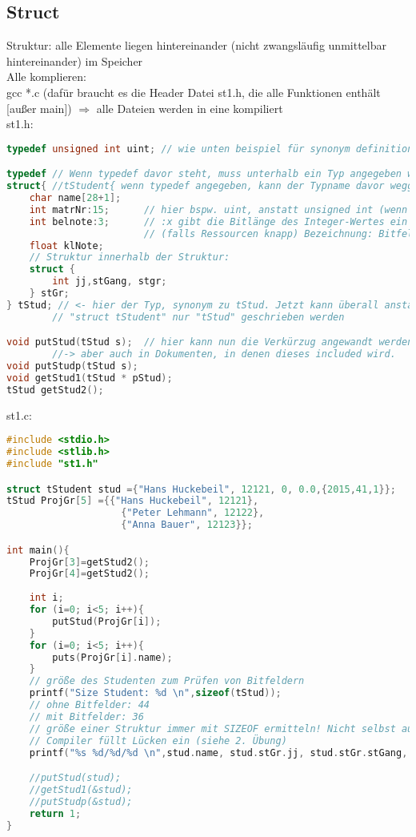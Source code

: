\subsection{Struct}
Struktur: alle Elemente liegen hintereinander (nicht zwangsläufig unmittelbar hintereinander) im Speicher \medskip\\
Alle komplieren:\\
gcc *.c (dafür braucht es die Header Datei st1.h, die alle Funktionen enthält [außer main]) $\Rightarrow$ alle Dateien werden in eine kompiliert\\
st1.h:
\begin{lstlisting}[language=C]
typedef unsigned int uint; // wie unten beispiel für synonym definition

typedef	// Wenn typedef davor steht, muss unterhalb ein Typ angegeben werden
struct{ //tStudent{ wenn typedef angegeben, kann der Typname davor weggelassen werden.
	char name[28+1];
	int matrNr:15;		// hier bspw. uint, anstatt unsigned int (wenn benötigt)
	int belnote:3;		// :x gibt die Bitlänge des Integer-Wertes ein 
						// (falls Ressourcen knapp) Bezeichnung: Bitfelder
	float klNote;
	// Struktur innerhalb der Struktur:
	struct {
		int jj,stGang, stgr;
	} stGr;
} tStud; // <- hier der Typ, synonym zu tStud. Jetzt kann überall anstatt 
		// "struct tStudent" nur "tStud" geschrieben werden

void putStud(tStud s);	// hier kann nun die Verkürzug angewandt werden 
		//-> aber auch in Dokumenten, in denen dieses included wird.
void putStudp(tStud s);
void getStud1(tStud * pStud);
tStud getStud2();
\end{lstlisting}
st1.c:
\begin{lstlisting}[language=C]
#include <stdio.h>
#include <stlib.h>
#include "st1.h"

struct tStudent stud ={"Hans Huckebeil", 12121, 0, 0.0,{2015,41,1}};
tStud ProjGr[5] ={{"Hans Huckebeil", 12121},
					{"Peter Lehmann", 12122},
					{"Anna Bauer", 12123}};

int main(){
	ProjGr[3]=getStud2();
	ProjGr[4]=getStud2();
	
	int i;
	for (i=0; i<5; i++){
		putStud(ProjGr[i]);
	}
	for (i=0; i<5; i++){
		puts(ProjGr[i].name);
	}
	// größe des Studenten zum Prüfen von Bitfeldern
	printf("Size Student: %d \n",sizeof(tStud));
	// ohne Bitfelder: 44
	// mit Bitfelder: 36
	// größe einer Struktur immer mit SIZEOF ermitteln! Nicht selbst ausrechnen
	// Compiler füllt Lücken ein (siehe 2. Übung)
	printf("%s %d/%d/%d \n",stud.name, stud.stGr.jj, stud.stGr.stGang, stud.stGr.stgr);

	//putStud(stud);
	//getStud1(&stud);
	//putStudp(&stud);
	return 1;
}
\end{lstlisting}

